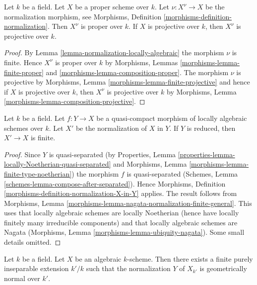 \begin{lemma}
\label{lemma-normalize-projective}
Let $k$ be a field. Let $X$ be a proper scheme over $k$.
Let $\nu : X^\nu \to X$ be the normalization morphism, see
Morphisms, Definition \ref{morphisms-definition-normalization}.
Then $X^\nu$ is proper over $k$. If $X$ is projective over $k$,
then $X^\nu$ is projective over $k$.
\end{lemma}

\begin{proof}
By Lemma \ref{lemma-normalization-locally-algebraic} the morphism $\nu$
is finite. Hence $X^\nu$ is proper over $k$ by
Morphisms, Lemmas \ref{morphisms-lemma-finite-proper} and
\ref{morphisms-lemma-composition-proper}.
The morphism $\nu$ is projective by
Morphisms, Lemma \ref{morphisms-lemma-finite-projective}
and hence if $X$ is projective over $k$, then $X^\nu$ is projective over $k$
by Morphisms, Lemma \ref{morphisms-lemma-composition-projective}.
\end{proof}

\begin{lemma}
\label{lemma-relative-normalization-finite}
Let $k$ be a field. Let $f : Y \to X$ be a quasi-compact
morphism of locally algebraic schemes over $k$. Let $X'$
be the normalization of $X$ in $Y$. If $Y$ is reduced, then
$X' \to X$ is finite.
\end{lemma}

\begin{proof}
Since $Y$ is quasi-separated (by
Properties, Lemma \ref{properties-lemma-locally-Noetherian-quasi-separated} and
Morphisms, Lemma \ref{morphisms-lemma-finite-type-noetherian})
the morphism $f$ is quasi-separated
(Schemes, Lemma \ref{schemes-lemma-compose-after-separated}).
Hence Morphisms, Definition \ref{morphisms-definition-normalization-X-in-Y}
applies. The result follows from Morphisms, Lemma
\ref{morphisms-lemma-nagata-normalization-finite-general}.
This uses that locally algebraic schemes are locally Noetherian
(hence have locally finitely many irreducible components)
and that locally algebraic schemes are Nagata
(Morphisms, Lemma \ref{morphisms-lemma-ubiquity-nagata}).
Some small details omitted.
\end{proof}

\begin{lemma}
\label{lemma-finite-extension-geometrically-normal}
Let $k$ be a field. Let $X$ be an algebraic $k$-scheme.
Then there exists a finite purely inseparable extension $k'/k$
such that the normalization $Y$ of $X_{k'}$ is geometrically normal over $k'$.
\end{lemma}

